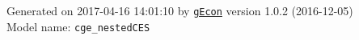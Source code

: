 \documentclass[10pt,a4paper]{article}
\numberwithin{equation}{section}
\begin{document}
\begin{landscape}
\begin{flushleft}{\large
Generated  on 2017-04-16 14:01:10 by \href{http://gecon.r-forge.r-project.org/}{\texttt{gEcon}} version 1.0.2 (2016-12-05)\\
Model name: \verb+cge_nestedCES+
}\end{flushleft}


\end{landscape}

\end{document}
